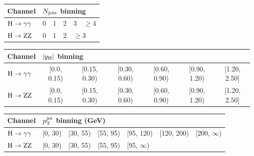 \begin{table}[htb]
    \centering
    \label{tab:binningnjets}
    \begin{tabular}{lccccc}
    Channel & \multicolumn{5}{l}{$N_\text{jets} $ binning} \\[\tablelineskip]
    \hline
    $\mathrm{H}\to\mathrm{\gamma}\mathrm{\gamma}$ & 0 & 1 & 2 & 3 & $\ge$4 \\
    $\mathrm{H}\to\mathrm{Z}\mathrm{Z}$ & 0 & 1 & 2 & \multicolumn{2}{l}{$\ge$3} \\
    \end{tabular}
    \end{table}

\begin{table}[htb]
    \centering
    \label{tab:binningabsy}
    \begin{tabular}{lcccccc}
    Channel & \multicolumn{6}{l}{$\left|y_\mathrm{H}\right| $ binning} \\[\tablelineskip]
    \hline
    $\mathrm{H}\to\mathrm{\gamma}\mathrm{\gamma}$ & [0.0, 0.15) & [0.15, 0.30) & [0.30, 0.60) & [0.60, 0.90) & [0.90, 1.20) & [1.20, 2.50] \\
    $\mathrm{H}\to\mathrm{Z}\mathrm{Z}$ & [0.0, 0.15) & [0.15, 0.30) & [0.30, 0.60) & [0.60, 0.90) & [0.90, 1.20) & [1.20, 2.50] \\
    \end{tabular}
    \end{table}

\begin{table}[h!]
    \centering
    \label{tab:binningptjet}
    \begin{tabular}{lcccccc}
    Channel & \multicolumn{6}{l}{$p_\mathrm{T}^\text{jet} $ binning (GeV)} \\[\tablelineskip]
    \hline
    $\mathrm{H}\to\mathrm{\gamma}\mathrm{\gamma}$ & [0, 30) & [30, 55) & [55, 95) & [95, 120) & [120, 200) & [200, $\infty$) \\
    $\mathrm{H}\to\mathrm{Z}\mathrm{Z}$ & [0, 30) & [30, 55) & [55, 95) & \multicolumn{3}{l}{ [95, $\infty$) } \\
    \end{tabular}
    \end{table}













